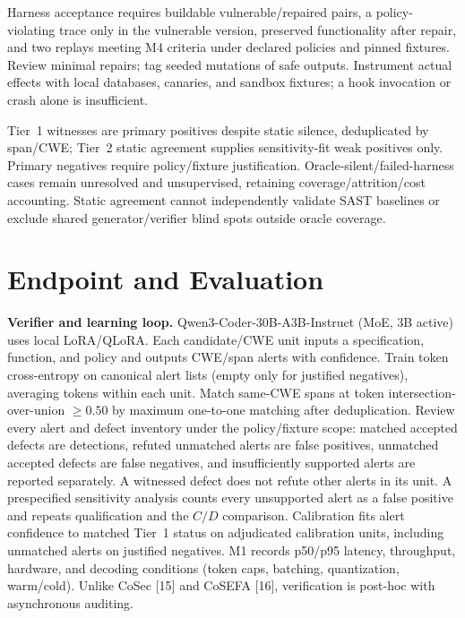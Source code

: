 \documentclass[11pt]{article}
\begin{document}
Harness acceptance requires buildable vulnerable/repaired pairs, a policy-violating trace only in the vulnerable version, preserved functionality after repair, and two replays meeting M4 criteria under declared policies and pinned fixtures. Review minimal repairs; tag seeded mutations of safe outputs. Instrument actual effects with local databases, canaries, and sandbox fixtures; a hook invocation or crash alone is insufficient.

Tier~1 witnesses are primary positives despite static silence, deduplicated by span/CWE; Tier~2 static agreement supplies sensitivity-fit weak positives only. Primary negatives require policy/fixture justification. Oracle-silent/failed-harness cases remain unresolved and unsupervised, retaining coverage/attrition/cost accounting. Static agreement cannot independently validate SAST baselines or exclude shared generator/verifier blind spots outside oracle coverage.
\section*{Endpoint and Evaluation}
\textbf{Verifier and learning loop.} Qwen3-Coder-30B-A3B-Instruct (MoE, 3B active) uses local LoRA/QLoRA. Each candidate/CWE unit inputs a specification, function, and policy and outputs CWE/span alerts with confidence. Train token cross-entropy on canonical alert lists (empty only for justified negatives), averaging tokens within each unit. Match same-CWE spans at token intersection-over-union $\geq0.50$ by maximum one-to-one matching after deduplication. Review every alert and defect inventory under the policy/fixture scope: matched accepted defects are detections, refuted unmatched alerts are false positives, unmatched accepted defects are false negatives, and insufficiently supported alerts are reported separately. A witnessed defect does not refute other alerts in its unit. A prespecified sensitivity analysis counts every unsupported alert as a false positive and repeats qualification and the $C/D$ comparison. Calibration fits alert confidence to matched Tier~1 status on adjudicated calibration units, including unmatched alerts on justified negatives. M1 records p50/p95 latency, throughput, hardware, and decoding conditions (token caps, batching, quantization, warm/cold). Unlike CoSec [15] and CoSEFA [16], verification is post-hoc with asynchronous auditing.
\end{document}
